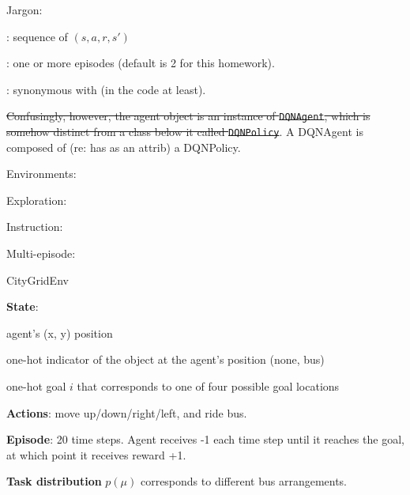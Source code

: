 \documentclass[11pt]{article}
\begin{document}

Jargon:
\begin{compactitem}
	\item {}: sequence of  $(s, a, r, s')$
	
	\item {}: one or more episodes (default is 2 for this homework). 
	
	\item {}: synonymous with  (in the code at least). 
	\begin{compactitem}
		\item \sout{Confusingly, however, the agent object is an instance of \texttt{DQNAgent}, which is somehow distinct from a class below it called \texttt{DQNPolicy}}. A DQNAgent is composed of (re: has as an attrib) a DQNPolicy. 
	\end{compactitem}
	
	\item Environments:
	\begin{compactitem}
		\item Exploration: 
		\item Instruction:
		\item Multi-episode: 
	\end{compactitem}
\end{compactitem}

\begin{itemdefinition}{CityGridEnv}{}
	\item \textbf{State}: 
	\begin{compactitem}
		\item agent's (x, y) position
		\item one-hot indicator of the object at the agent's position (none, bus)
		\item one-hot goal  $i$ that corresponds to one of four possible goal locations
	\end{compactitem}

	\item \textbf{Actions}: move up/down/right/left, and ride bus.
	
	\item \textbf{Episode}: 20 time steps. Agent receives -1 each time step until it reaches the goal, at which point it receives reward +1. 
	
	\item \textbf{Task distribution} $p(\mu)$ corresponds to different bus arrangements.
\end{itemdefinition}
\end{document}
